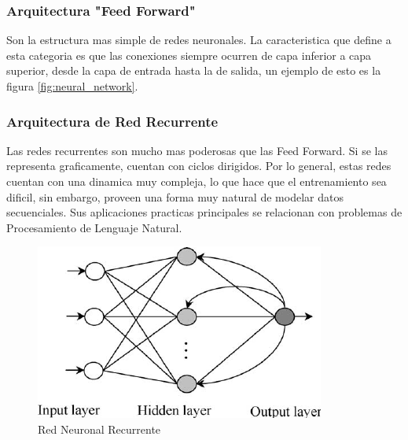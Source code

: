 \documentclass[a4paper,11pt,spanish]{book}
\begin{document}
      \subsubsection {Arquitectura "Feed Forward"}
	Son la estructura mas simple de redes neuronales. La caracteristica que define a esta categoria es que las conexiones siempre ocurren de capa inferior a capa superior,
	desde la capa de entrada hasta la de salida, un ejemplo de esto es la figura \ref{fig:neural_network}.
      \subsubsection {Arquitectura de Red Recurrente}
	Las redes recurrentes son mucho mas poderosas que las Feed Forward. Si se las representa graficamente, cuentan con ciclos dirigidos. Por lo general, estas redes cuentan
	con una dinamica muy compleja, lo que hace que el entrenamiento sea dificil, sin embargo, proveen una forma muy natural de modelar datos secuenciales. Sus aplicaciones practicas
	principales se relacionan con problemas de Procesamiento de Lenguaje Natural.
	\begin{figure}[H]
	  \begin{center}
	   \includegraphics[width=0.6\linewidth]{./img/rnn.png}
	  \end{center}
	  \caption{Red Neuronal Recurrente}
	  \label{fig:rnn}
	\end{figure}
\end{document}
